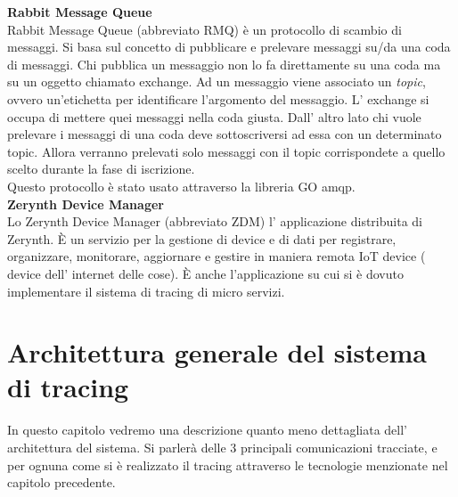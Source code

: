 \documentclass[a4paper,12pt,titlepage,italian,openany]{report}
\begin{document}
\textbf{Rabbit Message Queue}\\
Rabbit Message Queue\cite{rabbit:1} (abbreviato RMQ\cite{rabbit:1}) è un protocollo di scambio di messaggi. Si basa sul concetto di pubblicare e prelevare messaggi su/da una coda di messaggi. Chi pubblica un messaggio non lo fa direttamente su una coda ma su un oggetto chiamato exchange. Ad un messaggio viene associato un \textit{topic}, ovvero un'etichetta per identificare l'argomento del messaggio. L' exchange si occupa di mettere quei messaggi nella coda giusta. Dall' altro lato chi 
vuole prelevare i messaggi di una coda deve sottoscriversi ad essa con un determinato topic. Allora verranno prelevati solo messaggi con il topic corrispondete a quello scelto durante la fase di iscrizione.\\
Questo protocollo è stato usato attraverso la libreria GO amqp.\\[12pt]

\textbf{Zerynth Device Manager}\\
Lo Zerynth Device Manager\cite{zdm:1} (abbreviato ZDM) l' applicazione distribuita di Zerynth. È un servizio per la gestione di device e di dati per registrare, organizzare, monitorare, aggiornare e gestire in maniera remota IoT device ( device dell' internet delle cose).
È anche l'applicazione su cui si è dovuto implementare il sistema di tracing di micro servizi.

\chapter{Architettura generale del sistema di tracing}
In questo capitolo vedremo una descrizione quanto meno dettagliata dell' architettura del sistema. Si parlerà delle 3 principali comunicazioni tracciate, e per ognuna come si è realizzato il tracing attraverso le
tecnologie menzionate nel capitolo precedente.
\end{document}
